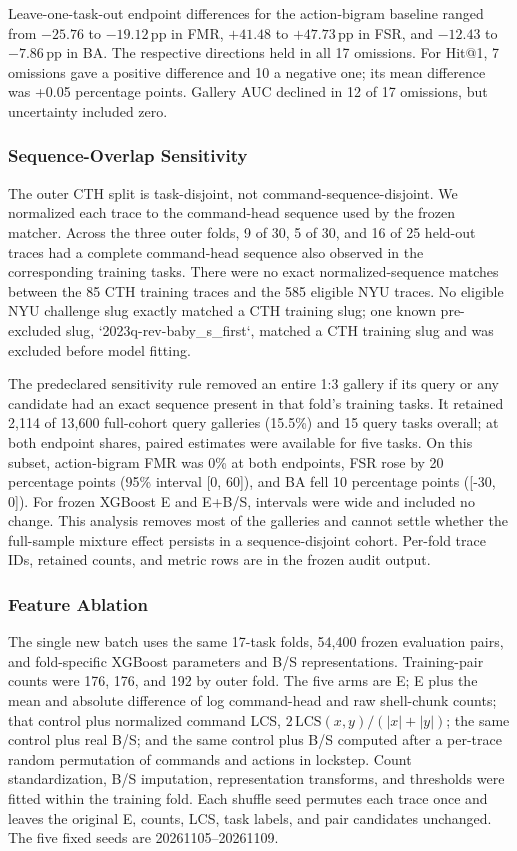\documentclass[10pt]{article}
\newcommand{\pp}{\ensuremath{\,\mathrm{pp}}}
\begin{document}
Leave-one-task-out endpoint differences for the action-bigram baseline ranged from $-25.76$ to $-19.12\pp$ in FMR, $+41.48$ to $+47.73\pp$ in FSR, and $-12.43$ to $-7.86\pp$ in BA. The respective directions held in all 17 omissions. For Hit@1, 7 omissions gave a positive difference and 10 a negative one; its mean difference was +0.05 percentage points. Gallery AUC declined in 12 of 17 omissions, but uncertainty included zero.

\subsubsection{Sequence-Overlap Sensitivity}
The outer CTH split is task-disjoint, not command-sequence-disjoint. We normalized each trace to the command-head sequence used by the frozen matcher. Across the three outer folds, 9 of 30, 5 of 30, and 16 of 25 held-out traces had a complete command-head sequence also observed in the corresponding training tasks. There were no exact normalized-sequence matches between the 85 CTH training traces and the 585 eligible NYU traces. No eligible NYU challenge slug exactly matched a CTH training slug; one known pre-excluded slug, `2023q-rev-baby\_s\_first`, matched a CTH training slug and was excluded before model fitting.

The predeclared sensitivity rule removed an entire 1:3 gallery if its query or any candidate had an exact sequence present in that fold's training tasks. It retained 2,114 of 13,600 full-cohort query galleries (15.5\%) and 15 query tasks overall; at both endpoint shares, paired estimates were available for five tasks. On this subset, action-bigram FMR was 0\% at both endpoints, FSR rose by 20 percentage points (95\% interval [0, 60]), and BA fell 10 percentage points ([-30, 0]). For frozen XGBoost E and E+B/S, intervals were wide and included no change. This analysis removes most of the galleries and cannot settle whether the full-sample mixture effect persists in a sequence-disjoint cohort. Per-fold trace IDs, retained counts, and metric rows are in the frozen audit output.

\subsubsection{Feature Ablation}
The single new batch uses the same 17-task folds, 54,400 frozen evaluation pairs, and fold-specific XGBoost parameters and B/S representations. Training-pair counts were 176, 176, and 192 by outer fold. The five arms are E; E plus the mean and absolute difference of log command-head and raw shell-chunk counts; that control plus normalized command LCS, $2\,\mathrm{LCS}(x,y)/(|x|+|y|)$; the same control plus real B/S; and the same control plus B/S computed after a per-trace random permutation of commands and actions in lockstep. Count standardization, B/S imputation, representation transforms, and thresholds were fitted within the training fold. Each shuffle seed permutes each trace once and leaves the original E, counts, LCS, task labels, and pair candidates unchanged. The five fixed seeds are 20261105--20261109.
\end{document}
